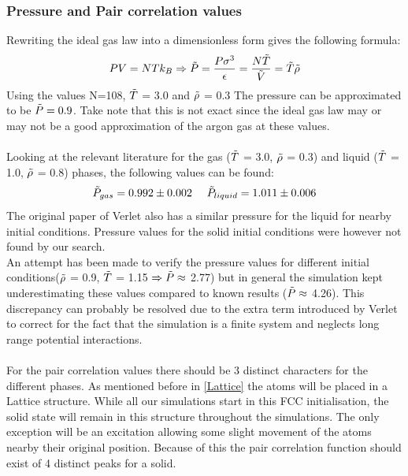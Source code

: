 \documentclass[a4paper,12pt]{article} %
\begin{document}
\subsubsection{Pressure and Pair correlation values}
Rewriting the ideal gas law into a dimensionless form gives the following formula:
\begin{equation}
    PV=NTk_B \Rightarrow \Tilde{P} = \frac{P\sigma^3}{\epsilon} = \frac{N\Tilde{T}}{\Tilde{V}} = \Tilde{T}\Tilde{\rho}
\end{equation}
Using the values N=108,  $\Tilde{T}$ = 3.0 and $\Tilde{\rho}$ = 0.3 The pressure can be approximated to be $\Tilde{P} = 0.9$. Take note that this is not exact since the ideal gas law may or may not be a good approximation of the argon gas at these values.\\
\\
Looking at the relevant literature\cite{Johnson} for the gas ($\Tilde{T}$ = 3.0, $\Tilde{\rho}$ = 0.3) and liquid ($\Tilde{T}$ = 1.0, $\Tilde{\rho}$ = 0.8) phases, the following values can be found:
\begin{equation}
    \Tilde{P}_{gas} = 0.992 \pm 0.002 \ \ \ \ \Tilde{P}_{liquid} = 1.011 \pm 0.006
\end{equation}
The original paper of Verlet also has a similar pressure for the liquid for nearby initial conditions\cite{verlet1967}. Pressure values for the solid initial conditions were however not found by our search.\\
An attempt has been made to verify the pressure values for different initial conditions($\Tilde{\rho}$ = 0.9, $\Tilde{T}$ = 1.15 $\Rightarrow \Tilde{P}\approx$ 2.77) but in general the simulation kept underestimating these values compared to known results ($\Tilde{P} \approx $ 4.26)\cite{Johnson}. This discrepancy can probably be resolved due to the extra term introduced by Verlet to correct for the fact that the simulation is a finite system and neglects long range potential interactions.\cite{verlet1967}\\
\\
For the pair correlation values there should be 3 distinct characters for the different phases. As mentioned before in \eqref{Lattice} the atoms will be placed in a Lattice structure. While all our simulations start in this FCC initialisation, the solid state will remain in this structure throughout the simulations. The only exception will be an excitation allowing some slight movement of the atoms nearby their original position. Because of this the pair correlation function should exist of 4 distinct peaks for a solid. \\
\end{document}
